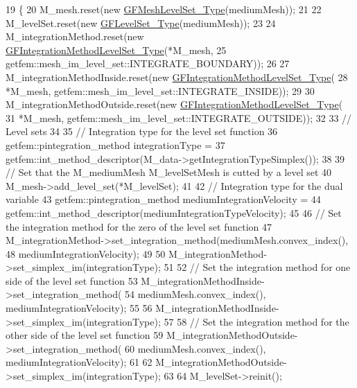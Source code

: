 \begin{DoxyCode}
19 \{
20     M\_mesh.reset(\textcolor{keyword}{new} \hyperlink{Core_8h_a126f7165f04db4ed0b72454469145a08}{GFMeshLevelSet\_Type}(mediumMesh));
21 
22     M\_levelSet.reset(\textcolor{keyword}{new} \hyperlink{Core_8h_a71358a15bd3925629e26ccbb214a0133}{GFLevelSet\_Type}(mediumMesh));
23 
24     M\_integrationMethod.reset(\textcolor{keyword}{new} \hyperlink{Core_8h_ade18ba6e17965b6fdd50b3382b2a7020}{GFIntegrationMethodLevelSet\_Type}(*M\_mesh,
25             getfem::mesh\_im\_level\_set::INTEGRATE\_BOUNDARY));
26 
27     M\_integrationMethodInside.reset(\textcolor{keyword}{new} \hyperlink{Core_8h_ade18ba6e17965b6fdd50b3382b2a7020}{GFIntegrationMethodLevelSet\_Type}(
28             *M\_mesh, getfem::mesh\_im\_level\_set::INTEGRATE\_INSIDE));
29 
30     M\_integrationMethodOutside.reset(\textcolor{keyword}{new} \hyperlink{Core_8h_ade18ba6e17965b6fdd50b3382b2a7020}{GFIntegrationMethodLevelSet\_Type}(
31             *M\_mesh, getfem::mesh\_im\_level\_set::INTEGRATE\_OUTSIDE));
32 
33     \textcolor{comment}{// Level sets}
34 
35     \textcolor{comment}{// Integration type for the level set function}
36     getfem::pintegration\_method integrationType =
37             getfem::int\_method\_descriptor(M\_data->getIntegrationTypeSimplex());
38 
39     \textcolor{comment}{// Set that the M\_mediumMesh M\_levelSetMesh is cutted by a level set}
40     M\_mesh->add\_level\_set(*M\_levelSet);
41 
42     \textcolor{comment}{// Integration type for the dual variable}
43     getfem::pintegration\_method mediumIntegrationVelocity =
44             getfem::int\_method\_descriptor(mediumIntegrationTypeVelocity);
45 
46     \textcolor{comment}{// Set the integration method for the zero of the level set function}
47     M\_integrationMethod->set\_integration\_method(mediumMesh.convex\_index(),
48             mediumIntegrationVelocity);
49 
50     M\_integrationMethod->set\_simplex\_im(integrationType);
51 
52     \textcolor{comment}{// Set the integration method for one side of the level set function}
53     M\_integrationMethodInside->set\_integration\_method(
54             mediumMesh.convex\_index(), mediumIntegrationVelocity);
55 
56     M\_integrationMethodInside->set\_simplex\_im(integrationType);
57 
58     \textcolor{comment}{// Set the integration method for the other side of the level set function}
59     M\_integrationMethodOutside->set\_integration\_method(
60             mediumMesh.convex\_index(), mediumIntegrationVelocity);
61 
62     M\_integrationMethodOutside->set\_simplex\_im(integrationType);
63 
64     M\_levelSet->reinit();

\end{DoxyCode}
